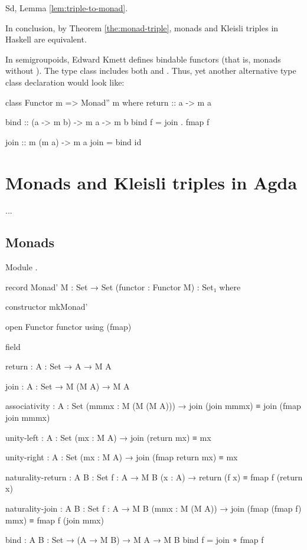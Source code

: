 Sd, Lemma \ref{lem:triple-to-monad}.

In conclusion, by Theorem \ref{the:monad-triple}, monads and Kleisli triples
in Haskell are equivalent.

\begin{remark}

  In semigroupoids, Edward Kmett defines bindable functors (that is,
  monads without ). The type class
   includes both  and
  . Thus, yet another alternative type class
  declaration would look like:
  \begin{codehaskell}
class Functor m => Monad'' m where
  return :: a -> m a

  bind :: (a -> m b) -> m a -> m b
  bind f = join . fmap f

  join :: m (m a) -> m a
  join = bind id
  \end{codehaskell}

\end{remark}

\section{Monads and Kleisli triples in Agda}
\label{sec:monads-agda}

...


\subsection*{Monads}

Module .

\begin{codeagda}
record Monad' {M : Set → Set} (functor : Functor M) : Set₁ where

  constructor mkMonad'

  open Functor functor using (fmap)

  field

    return : {A : Set} → A → M A

    join   : {A : Set} → M (M A) → M A

    associativity : {A : Set} (mmmx : M (M (M A))) →
                    join (join mmmx) ≡ join (fmap join mmmx)

    unity-left    : {A : Set} (mx : M A) → join (return mx) ≡ mx

    unity-right   : {A : Set} (mx : M A) → join (fmap return mx) ≡ mx

    naturality-return : {A B : Set} {f : A → M B} (x : A) →
                        return (f x) ≡ fmap f (return x)

    naturality-join   : {A B : Set} {f : A → M B} (mmx : M (M A)) →
                        join (fmap (fmap f) mmx) ≡ fmap f (join mmx)

  bind : {A B : Set} → (A → M B) → M A → M B
  bind f = join ∘ fmap f
\end{codeagda}

